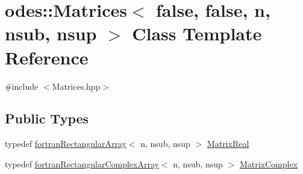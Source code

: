 \hypertarget{classodes_1_1Matrices_3_01false_00_01false_00_01n_00_01nsub_00_01nsup_01_4}{}\section{odes\+:\+:Matrices$<$ false, false, n, nsub, nsup $>$ Class Template Reference}
\label{classodes_1_1Matrices_3_01false_00_01false_00_01n_00_01nsub_00_01nsup_01_4}


{\ttfamily \#include $<$Matrices.\+hpp$>$}

\subsection*{Public Types}
\begin{DoxyCompactItemize}
\item 
typedef \hyperlink{classodes_1_1fortranRectangularArray}{fortran\+Rectangular\+Array}$<$ n, nsub, nsup $>$ \hyperlink{classodes_1_1Matrices_3_01false_00_01false_00_01n_00_01nsub_00_01nsup_01_4_a16870437fa110da1b60636c6e108b357}{Matrix\+Real}
\item 
typedef \hyperlink{classodes_1_1fortranRectangularComplexArray}{fortran\+Rectangular\+Complex\+Array}$<$ n, nsub, nsup $>$ \hyperlink{classodes_1_1Matrices_3_01false_00_01false_00_01n_00_01nsub_00_01nsup_01_4_aeedabda8f5222d638b092cd1e4cf55f0}{Matrix\+Complex}
\end{DoxyCompactItemize}
